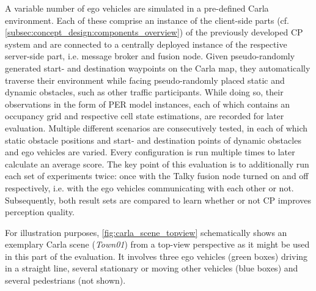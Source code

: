 A variable number of ego vehicles are simulated in a pre-defined Carla environment. Each of these comprise an instance of the client-side parts (cf. \cref{subsec:concept_design:components_overview}) of the previously developed CP system and are connected to a centrally deployed instance of the respective server-side part, i.e. message broker and fusion node. Given pseudo-randomly generated start- and destination waypoints on the Carla map, they automatically traverse their environment while facing pseudo-randomly placed static and dynamic obstacles, such as other traffic participants. While doing so, their observations in the form of PER model instances, each of which contains an occupancy grid and respective cell state estimations, are recorded for later evaluation. Multiple different scenarios are consecutively tested, in each of which static obstacle positions and start- and destination points of dynamic obstacles and ego vehicles are varied. Every configuration is run multiple times to later calculate an average score. The key point of this evaluation is to additionally run each set of experiments twice: once with the Talky fusion node turned on and off respectively, i.e. with the ego vehicles communicating with each other or not. Subsequently, both result sets are compared to learn whether or not CP improves perception quality.

For illustration purposes, \cref{fig:carla_scene_topview} schematically shows an exemplary Carla scene (\textit{Town01}) from a top-view perspective as it might be used in this part of the evaluation. It involves three ego vehicles (green boxes) driving in a straight line, several stationary or moving other vehicles (blue boxes) and several pedestrians (not shown).
\par
\bigskip

